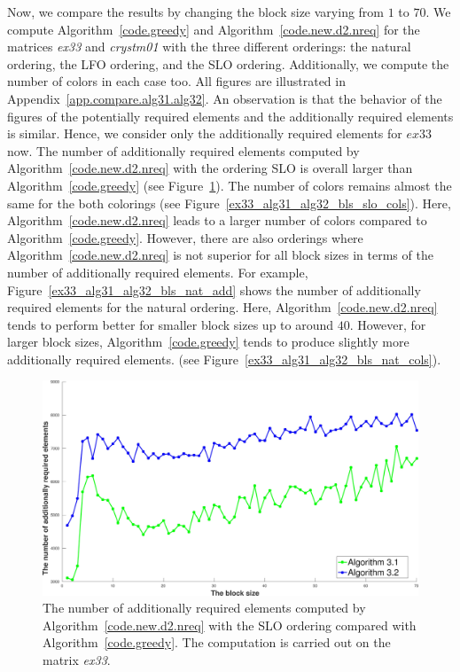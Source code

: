 \documentclass[12pt, twoside,a4paper,toc=bibliography]{scrbook}
\newcommand{\figref}[1]{Figure~\protect\ref{#1}}
\newcommand{\coderef}[1]{Algorithm~\protect\ref{#1}}
\newcommand{\appref}[1]{Appendix~\protect\ref{#1}}
\begin{document}
Now, we compare the results by changing the block size varying from $1$ to $70$.
We compute \coderef{code.greedy} and \coderef{code.new.d2.nreq} for the matrices \textit{ex33}
and \textit{crystm01} with the three different orderings: the natural ordering, the LFO ordering,
and the SLO ordering. Additionally, we compute the number of colors in each case too.
All figures are illustrated in \appref{app.compare.alg31.alg32}.
An observation is that the behavior of the figures of the potentially required elements and
the additionally required elements is similar. Hence, we consider only the additionally
required elements for $ex33$ now.
The number of additionally required elements computed by \coderef{code.new.d2.nreq} with the ordering SLO
is overall larger than \coderef{code.greedy} (see \figref{ex33_alg31_alg32_bls_slo_add}).
The number of colors remains almost the same for the both colorings
(see \figref{ex33_alg31_alg32_bls_slo_cols}).
Here, \coderef{code.new.d2.nreq} leads to a larger number of colors compared to \coderef{code.greedy}.
However, there are also orderings where \coderef{code.new.d2.nreq} is not superior for all block sizes in terms of
the number of additionally required elements.
For example, \figref{ex33_alg31_alg32_bls_nat_add} shows the number of additionally required elements
for the natural ordering.
Here, \coderef{code.new.d2.nreq} tends to perform better for smaller block sizes up to around $40$.
However, for larger block sizes, \coderef{code.greedy} tends to produce slightly more additionally required elements.
(see \figref{ex33_alg31_alg32_bls_nat_cols}).

\begin{figure}
\centering
\includegraphics[width=0.9\linewidth]{ex33_alg31_alg32_bls_slo_add}
\caption{
The number of additionally required elements computed by
\coderef{code.new.d2.nreq} with the SLO ordering
compared with \coderef{code.greedy}.
The computation is carried out on the matrix \textit{ex33}. }
\label{ex33_alg31_alg32_bls_slo_add}
\end{figure}
\end{document}
